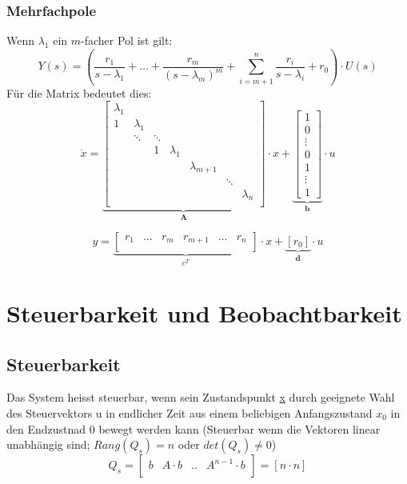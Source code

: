 \subsubsection{Mehrfachpole}
Wenn $\lambda_1$ ein $m$-facher Pol ist gilt:
\[
	Y(s) = \left( \frac{r_1}{s-\lambda_1} + \ldots + \frac{r_m}{\left(s-\lambda_m\right)^m} + \sum_{i=m+1}^{n} \frac{r_i}{s-\lambda_i} + r_0\right) \cdot U(s)
\]
Für die Matrix bedeutet dies:
\[
	\dot x=
	\underbrace{
		\begin{bmatrix}
			\lambda_1 &	 		  &  		& 	& & & \\
			1 		  & \lambda_1 &  		&  	& & &\\
			 		  & \ddots 	  & \ddots 	& 	& & &\\
				  	  & 	 	  & 1 		& \lambda_1 & & & \\
			 	      &  		  &  		&  	& \lambda_{m+1} & &\\	
			 	      &  		  &  		&  	& 				& \ddots &\\
			 	      &  		  &  		&  	& 				&  & \lambda_n\\
		\end{bmatrix}
	}_{\textbf{A}}
	\cdot x +
	\underbrace{
		\begin{bmatrix}
			1 \\
			0 \\
			\vdots \\
			0 \\
			1\\
			\vdots\\
			1	
		\end{bmatrix}
	}_{\textbf{b}}
	\cdot u	
\]

\[
	y=
	\underbrace{
			\begin{bmatrix}
				r_1 & \ldots & r_m & r_{m+1} & \ldots & r_n\\
			\end{bmatrix}
	}_{\textbf{$c^T$}}
	\cdot x  +
	\underbrace{
		\left[ r_0 \right] 
	}_{\textbf{d}}
	\cdot u
\]

\section{Steuerbarkeit und Beobachtbarkeit}
\subsection{Steuerbarkeit}
Das System heisst steuerbar, wenn sein Zustandspunkt \underline{x} durch geeignete Wahl des Steuervektors u in endlicher Zeit aus einem beliebigen Anfangszustand $x_0$ in den Endzustnad 0 bewegt werden kann (Steuerbar wenn die Vektoren linear unabhängig sind; $Rang(Q_s) = n$ oder $det(Q_s)\neq 0$)
\[
	Q_s = 
	\begin{bmatrix}
			b	&	A\cdot b	& .. & A^{n-1} \cdot b\\
	\end{bmatrix}
	= \left[ n \cdot n\right] 
\]


